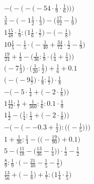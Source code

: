 \documentclass[8pt]{article}
\begin{document}
\begin{align}
-\bigg(-\Big(-\big(-54 \cdot \frac{1}{9} \cdot \frac{1}{6}\big)\Big)\bigg) \\
\frac{5}{8} - \big(-1\frac{1}{2} \cdot \frac{1}{3}\big) - \big(\frac{17}{72} - \frac{1}{9}\big) \\
1\frac{15}{48} \cdot \frac{1}{9} : \big(1\frac{1}{6} \cdot \frac{1}{7}\big) - \big(-\frac{1}{8}\big) \\
10\frac{1}{5} - \frac{1}{5} \cdot \big(-\frac{1}{40} + \frac{34}{72} \cdot \frac{1}{2} - \frac{1}{9}\big) \\
\frac{19}{24} + \frac{1}{3} - \Big(\frac{1}{36} : \frac{1}{9} \cdot \big(\frac{1}{4} + \frac{1}{4}\big)\Big) \\
\big(-7\frac{1}{3}\big) \cdot \big(\frac{1}{20} : \frac{1}{2}\big) + \frac{1}{6} + 0.1 \\
\Big(-\big(-9\frac{1}{7}\big) \cdot \frac{1}{8} : \frac{1}{7}\Big) \cdot \frac{1}{8} \\
-\Big(-5 \cdot \frac{1}{4} + \big(-2 \cdot \frac{1}{8}\big)\Big) \\
1\frac{11}{42} : \frac{1}{7} + \frac{1}{360} : \frac{1}{6} : 0.1 \cdot \frac{1}{9} \\
1\frac{1}{2} - \Big(\frac{1}{4} : \frac{1}{3} + \big(-2 \cdot \frac{1}{8}\big)\Big) \\
-\bigg(-\Big(--0.3 + \frac{1}{2}\Big) : \Big(\big(-\frac{1}{5}\big)\Big)\bigg) \\
1 + \frac{1}{36} : \frac{1}{4} - \Big(\big(-\frac{19}{90}\big) + 0.1\Big) \\
5 - \Big(\frac{11}{18} - \big(\frac{13}{36} - \frac{1}{4}\big)\Big) \cdot \frac{1}{3} - \frac{1}{2} \\
\frac{8}{9} : \frac{1}{9} \cdot \big(-\frac{21}{40} - \frac{1}{5} - \frac{1}{5}\big) \\
\frac{13}{56} + \big(-\frac{1}{8}\big) + \frac{1}{7} : \big(1\frac{1}{4} \cdot \frac{1}{5}\big)
\end{align}
\end{document}
